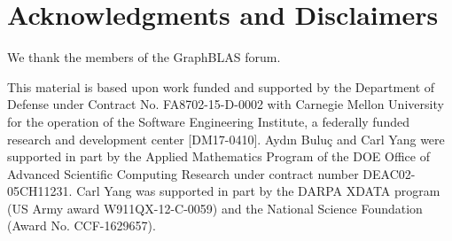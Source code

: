 %
%

\section*{Acknowledgments and Disclaimers}

We thank the members of the GraphBLAS forum.

This material is based upon work funded and supported by the Department of 
Defense under Contract No. FA8702-15-D-0002 with Carnegie Mellon University for 
the operation of the Software Engineering Institute, a federally funded research 
and development center [DM17-0410]. Ayd{\i}n Bulu\c{c} and Carl Yang were supported in part by the
Applied Mathematics Program of the DOE Office of Advanced
Scientific Computing Research under contract number DEAC02-05CH11231. Carl Yang was supported in part by
the DARPA XDATA program (US Army award W911QX-12-C-0059) and the National Science Foundation (Award No. CCF-1629657).